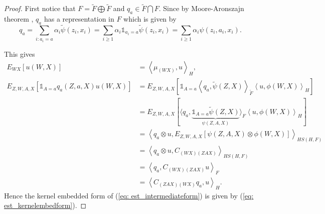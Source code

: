\begin{proof}
    First notice that $F=\tilde{F}\bigoplus\tilde{F}$ and $q_a\in\tilde{F}\bigcap F$. Since by Moore-Aronszajn theorem \cite{drewnik2021reproducingkernelhilbertspace}, 
    $q_a$ has a representation in $F$ which is given by 
    \begin{equation*}
        q_a = \sum_{i: a_i=a}\alpha_i\tilde{\psi}(z_i,x_i) = \sum_{i\geq 1}\alpha_i\mathds{1}_{a_i=a}\tilde{\psi}(z_i,x_i) = \sum_{i\geq 1}\alpha_i\psi(z_i,a_i,x_i).
    \end{equation*}

    This gives 
    \begin{align*}
        E_{WX}[u(W,X)] &= \left\langle \mu_{(WX)},u\right\rangle _{H}, \\
        E_{Z,W,A,X}[\mathds{1}_{A=a}q_a(Z,a,X)u(W,X)] &= E_{Z,W,A,X}\left[\mathds{1}_{A=a}\left\langle q_a, \tilde{\psi}(Z,X)\right\rangle _{\tilde{F}} \left\langle u, \phi(W,X)\right\rangle _H\right] \\
                                                      &= E_{Z,W,A,X}\left[\langle q_a, \underbrace{\mathds{1}_{A=a}\tilde{\psi}(Z,X)}_{\psi(Z,A,X)}\rangle _F \left\langle u, \phi(W,X)\right\rangle _H\right] \\
                                                      &= \left\langle q_a\otimes u, E_{Z,W,A,X}[\psi(Z,A,X)\otimes \phi(W,X)]\right\rangle _{HS(H,F)} \\
                                                      &= \left\langle q_a\otimes u, C_{(WX)(ZAX)}\right\rangle _{HS(H,F)} \\
                                                      &= \left\langle q_a, C_{(WX)(ZAX)}u\right\rangle _F \\
                                                      &= \left\langle C_{(ZAX)(WX)}q_a,u\right\rangle _H. 
    \end{align*}
    Hence the kernel embedded form of (\ref{eq: est_intermediateform}) is given by (\ref{eq: est_kernelembedform}). 
\end{proof}

